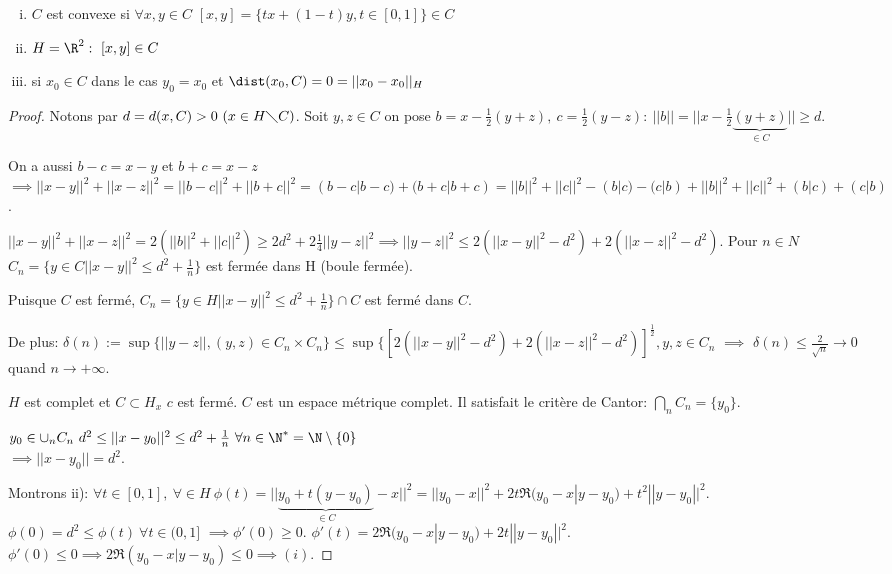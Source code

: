 
\begin{remark}
	\leavevmode
	\begin{enumerate}[(i)]
		\item $C$ est convexe si $\forall x, y \in C$ $[x,y]=\{tx+(1-t)y, t\in[0,1]\}\in C$
		\item $H=\R^2:\ [x,y]\in C$
		\item si $x_0\in C$ dans le cas $y_0=x_0$ et $\dist(x_0, C)=0=||x_0-x_0||_H$
	\end{enumerate}
\end{remark}

\begin{proof}
	Notons par $d=d(x,C)>0\ (x\in H\diagdown C)$. Soit $y, z\in C$ on pose $b=x-\frac12(y+z),\ c=\frac12(y-z):\ ||b||=||x-\frac12\underbrace{(y+z)}_{\in C}||\geq d$.
	
	On a aussi $b-c=x-y$ et $b+c=x-z$ $\implies ||x-y||^2+||x-z||^2=||b-c||^2+||b+c||^2=(b-c| b-c)+(b+c|b+c)=||b||^2+||c||^2-(b|c)-(c|b)+||b||^2+||c||^2 + (b|c)+(c|b)$.
	
	$||x-y||^2+||x-z||^2=2(||b||^2+||c||^2)\geq 2 d^2+2\frac14||y-z||^2 \implies ||y-z||^2\leq 2(||x-y||^2-d^2)+2(||x-z||^2-d^2)$. Pour $n\in N$ $C_n=\{y\in C ||x-y||^2\leq d^2+\frac1n\}$ est fermée dans H (boule fermée).
	
	Puisque $C$ est fermé, $C_n=\{y\in H ||x-y||^2\leq d^2+\frac1n\}\cap C$ est fermé dans $C$.
	
	De plus: $\delta (n):=\sup\{||y-z||, (y,z)\in C_n\times C_n\}\leq \sup\{[2(||x-y||^2-d^2)+2(||x-z||^2-d^2)]^\frac12, y,z\in C_n$ $\implies$ $\delta (n)\leq \frac2{\sqrt n}\to 0$ quand $n\to +\infty$.

$H$ est complet et $C\subset H_x$ $c$ est fermé. $C$ est un espace métrique complet. Il satisfait le critère de Cantor: $\bigcap\limits_n C_n=\{y_0\}$.


$y_0\in\cup_n C_n\ d^2\leq ||x-y_0||^2\leq d^2+\frac1n\ \forall n\in\N^*=\N\setminus\{0\}$\\
$\implies ||x-y_0||=d^2$.

Montrons ii): $\forall t\in[0,1],\ \forall\in H\ \phi(t)=||\underbrace{y_0+t(y-y_0)}_{\in C}-x||^2 = ||y_0-x||^2+2t\Re(y_0-x|y-y_0)+t^2||y-y_0||^2$. $\phi(0)=d^2\leq \phi(t)\ \forall t\in(0,1]$ $\implies \phi'(0)\geq 0$. $\phi'(t)=2\Re(y_0-x|y-y_0)+2t||y-y_0||^2$. $\phi'(0)\leq 0 \implies 2\Re(y_0-x|y-y_0)\leq 0\implies (i)$.

\end{proof}


